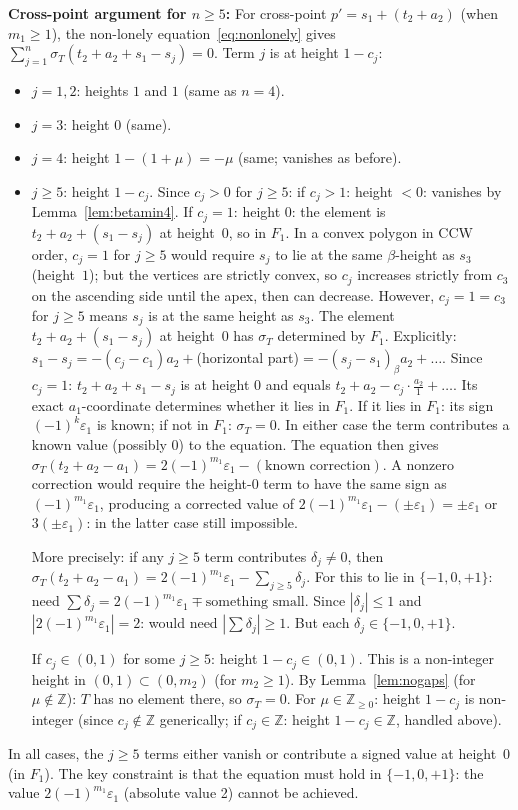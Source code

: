 \documentclass{article}
\begin{document}
\textbf{Cross-point argument for $n\ge 5$:}
For cross-point $p'=s_1+(t_2+a_2)$ (when $m_1\ge 1$), the non-lonely equation~\eqref{eq:nonlonely} gives
$\sum_{j=1}^n\sigma_T(t_2+a_2+s_1-s_j)=0$.
Term $j$ is at height $1-c_j$:
\begin{itemize}
\item $j=1,2$: heights $1$ and $1$ (same as $n=4$).
\item $j=3$: height $0$ (same).
\item $j=4$: height $1-(1+\mu)=-\mu$ (same; vanishes as before).
\item $j\ge 5$: height $1-c_j$.  Since $c_j>0$ for $j\ge 5$:
  if $c_j>1$: height $<0$: vanishes by Lemma~\ref{lem:betamin4}.
  If $c_j=1$: height $0$: the element is $t_2+a_2+(s_1-s_j)$ at height~$0$, so in $F_1$.
    In a convex polygon in CCW order, $c_j=1$ for $j\ge 5$ would require $s_j$ to lie at
    the same $\beta$-height as $s_3$ (height~$1$); but the vertices are strictly convex,
    so $c_j$ increases strictly from $c_3$ on the ascending side until the apex, then
    can decrease.  However, $c_j=1=c_3$ for $j\ge 5$ means $s_j$ is at the same height as $s_3$.
    The element $t_2+a_2+(s_1-s_j)$ at height~$0$ has $\sigma_T$ determined by $F_1$.
    Explicitly: $s_1-s_j=-(c_j-c_1)a_2+$(horizontal part)$=-(s_j-s_1)_\beta a_2+\ldots$.
    Since $c_j=1$: $t_2+a_2+s_1-s_j$ is at height $0$ and equals $t_2+a_2-c_j\cdot\frac{a_2}{1}+\ldots$.
    Its exact $a_1$-coordinate determines whether it lies in $F_1$.
    If it lies in $F_1$: its sign $(-1)^k\varepsilon_1$ is known; if not in $F_1$: $\sigma_T=0$.
    In either case the term contributes a known value (possibly $0$) to the equation.
    The equation then gives $\sigma_T(t_2+a_2-a_1)=2(-1)^{m_1}\varepsilon_1-(\text{known correction})$.
    A nonzero correction would require the height-$0$ term to have the same sign as $(-1)^{m_1}\varepsilon_1$,
    producing a corrected value of $2(-1)^{m_1}\varepsilon_1-(\pm\varepsilon_1)=\pm\varepsilon_1$ or $3(\pm\varepsilon_1)$:
    in the latter case still impossible.

    More precisely: if any $j\ge 5$ term contributes $\delta_j\ne 0$, then
    $\sigma_T(t_2+a_2-a_1)=2(-1)^{m_1}\varepsilon_1-\sum_{j\ge 5}\delta_j$.
    For this to lie in $\{-1,0,+1\}$: need $\sum\delta_j=2(-1)^{m_1}\varepsilon_1\mp\text{something small}$.
    Since $|\delta_j|\le 1$ and $|2(-1)^{m_1}\varepsilon_1|=2$: would need $|\sum\delta_j|\ge 1$.
    But each $\delta_j\in\{-1,0,+1\}$.

  If $c_j\in(0,1)$ for some $j\ge 5$: height $1-c_j\in(0,1)$.
    This is a non-integer height in $(0,1)\subset(0,m_2)$ (for $m_2\ge 1$).
    By Lemma~\ref{lem:nogaps} (for $\mu\notin\mathbb{Z}$): $T$ has no element there, so $\sigma_T=0$.
    For $\mu\in\mathbb{Z}_{\ge 0}$: height $1-c_j$ is non-integer (since $c_j\notin\mathbb{Z}$
    generically; if $c_j\in\mathbb{Z}$: height $1-c_j\in\mathbb{Z}$, handled above).
\end{itemize}
In all cases, the $j\ge 5$ terms either vanish or contribute a signed value at height~$0$
(in $F_1$).  The key constraint is that the equation must hold in $\{-1,0,+1\}$:
the value $2(-1)^{m_1}\varepsilon_1$ (absolute value 2) cannot be achieved.
\end{document}
